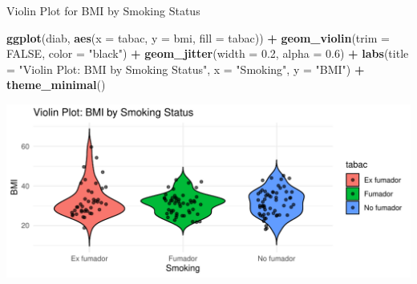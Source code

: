 \documentclass[
  ignorenonframetext,
]{beamer}
\newenvironment{Shaded}{\begin{snugshade}}{\end{snugshade}}
\newcommand{\AttributeTok}[1]{\textcolor[rgb]{0.13,0.29,0.53}{#1}}
\newcommand{\ConstantTok}[1]{\textcolor[rgb]{0.56,0.35,0.01}{#1}}
\newcommand{\FloatTok}[1]{\textcolor[rgb]{0.00,0.00,0.81}{#1}}
\newcommand{\FunctionTok}[1]{\textcolor[rgb]{0.13,0.29,0.53}{\textbf{#1}}}
\newcommand{\NormalTok}[1]{#1}
\newcommand{\SpecialCharTok}[1]{\textcolor[rgb]{0.81,0.36,0.00}{\textbf{#1}}}
\newcommand{\StringTok}[1]{\textcolor[rgb]{0.31,0.60,0.02}{#1}}
\begin{document}
\begin{frame}[fragile]{Violin Plot for BMI by Smoking Status}
\label{violin-plot-for-bmi-by-smoking-status}
\begin{Shaded}
\begin{Highlighting}[]
\FunctionTok{ggplot}\NormalTok{(diab, }\FunctionTok{aes}\NormalTok{(}\AttributeTok{x =}\NormalTok{ tabac, }\AttributeTok{y =}\NormalTok{ bmi, }\AttributeTok{fill =}\NormalTok{ tabac)) }\SpecialCharTok{+}
  \FunctionTok{geom\_violin}\NormalTok{(}\AttributeTok{trim =} \ConstantTok{FALSE}\NormalTok{, }\AttributeTok{color =} \StringTok{"black"}\NormalTok{) }\SpecialCharTok{+}
  \FunctionTok{geom\_jitter}\NormalTok{(}\AttributeTok{width =} \FloatTok{0.2}\NormalTok{, }\AttributeTok{alpha =} \FloatTok{0.6}\NormalTok{) }\SpecialCharTok{+}
  \FunctionTok{labs}\NormalTok{(}\AttributeTok{title =} \StringTok{"Violin Plot: BMI by Smoking Status"}\NormalTok{, }\AttributeTok{x =} \StringTok{"Smoking"}\NormalTok{, }\AttributeTok{y =} \StringTok{"BMI"}\NormalTok{) }\SpecialCharTok{+}
  \FunctionTok{theme\_minimal}\NormalTok{()}
\end{Highlighting}
\end{Shaded}

\includegraphics{StatisticsWithR-3-Exploratory_Analysis_II_And_Graphics_files/figure-beamer/unnamed-chunk-30-1.pdf}
\end{frame}
\end{document}

